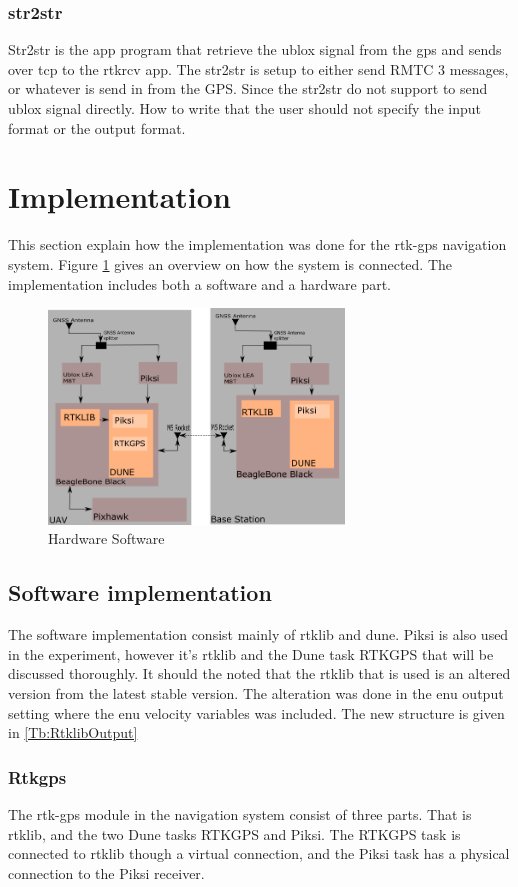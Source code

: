 \subsubsection{str2str}
Str2str is the app program that retrieve the ublox signal from the gps and sends over tcp to the rtkrcv app. The str2str is setup to either send RMTC 3 messages, or whatever is send in from the GPS. Since the str2str do not support to send ublox signal directly. How to write that the user should not specify the input format or the output format.


\section{Implementation}
This section explain how the implementation was done for the \gls{rtk-gps} navigation system. Figure \ref{figure:HardSoft} gives an overview on how the system is connected. The implementation includes both a software and a hardware part. 

\begin{figure}[H]
	\centering
		\includegraphics[width=0.7\textwidth]{figs/HardwareSoftware.png}
		\caption{Hardware Software}
		\label{figure:HardSoft}
\end{figure}
\subsection{Software implementation}
The software implementation consist mainly of rtklib and dune. Piksi is also used in the experiment, however it's rtklib and the Dune task RTKGPS that will be discussed thoroughly. It should the noted that the rtklib that is used is an altered version from the latest stable version. The alteration was done in the \gls{enu} output setting where the \gls{enu} velocity variables was included. The new structure is given in \ref{Tb:RtklibOutput}
\subsubsection{Rtkgps}
The \gls{rtk-gps} module in the navigation system consist of three parts. That is rtklib, and the two Dune tasks RTKGPS and Piksi. The RTKGPS task is connected to rtklib though a virtual connection, and the Piksi task has a physical connection to the Piksi receiver.


